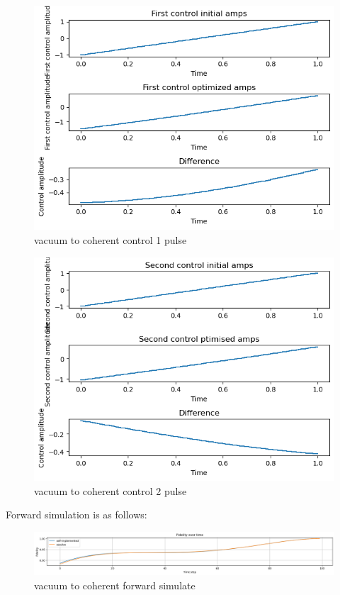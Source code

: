 \documentclass[12pt]{report}
\begin{document}
\begin{figure}[H]
    \centering
    \includegraphics[width=0.95\linewidth]{vac2coherent_control1.png}
    \caption{vacuum to coherent control 1 pulse}
    \label{fig:vac2coherent_control1}
\end{figure}
\begin{figure}[H]
    \centering
    \includegraphics[width=0.95\linewidth]{vac2coherent_control2.png}
    \caption{vacuum to coherent control 2 pulse}
    \label{fig:vac2coherent_control2}
\end{figure}

Forward simulation is as follows: 
\begin{figure}[H]
    \centering
    \includegraphics[width=0.95\linewidth]{vac2coherent_simulate.png}
    \caption{vacuum to coherent forward simulate}
    \label{fig:vac2coherent_simulate}
\end{figure}
\end{document}
